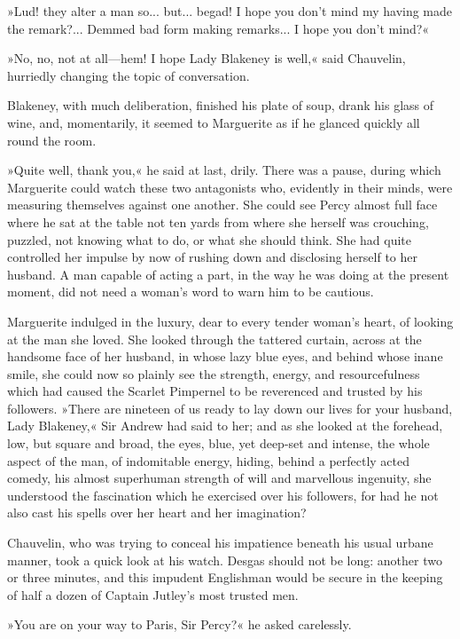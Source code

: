 »Lud! they alter a man so... but... begad! I hope you don't mind my having made the remark?... Demmed bad form making remarks... I hope you don't mind?«

»No, no, not at all\allowbreak---\allowbreak hem! I hope Lady Blakeney is well,« said Chauvelin, hurriedly changing the topic of conversation.

Blakeney, with much deliberation, finished his plate of soup, drank his glass of wine, and, momentarily, it seemed to Marguerite as if he glanced quickly all round the room.

»Quite well, thank you,« he said at last, drily. There was a pause, during which Marguerite could watch these two antagonists who, evidently in their minds, were measuring themselves against one another. She could see Percy almost full face where he sat at the table not ten yards from where she herself was crouching, puzzled, not knowing what to do, or what she should think. She had quite controlled her impulse by now of rushing down and disclosing herself to her husband. A man capable of acting a part, in the way he was doing at the present moment, did not need a woman's word to warn him to be cautious.

Marguerite indulged in the luxury, dear to every tender woman's heart, of looking at the man she loved. She looked through the tattered curtain, across at the handsome face of her husband, in whose lazy blue eyes, and behind whose inane smile, she could now so plainly see the strength, energy, and resourcefulness which had caused the Scarlet Pimpernel to be reverenced and trusted by his followers. »There are nineteen of us ready to lay down our lives for your husband, Lady Blakeney,« Sir Andrew had said to her; and as she looked at the forehead, low, but square and broad, the eyes, blue, yet deep-set and intense, the whole aspect of the man, of indomitable energy, hiding, behind a perfectly acted comedy, his almost superhuman strength of will and marvellous ingenuity, she understood the fascination which he exercised over his followers, for had he not also cast his spells over her heart and her imagination?

Chauvelin, who was trying to conceal his impatience beneath his usual urbane manner, took a quick look at his watch. Desgas should not be long: another two or three minutes, and this impudent Englishman would be secure in the keeping of half a dozen of Captain Jutley's most trusted men.

»You are on your way to Paris, Sir Percy?« he asked carelessly.

